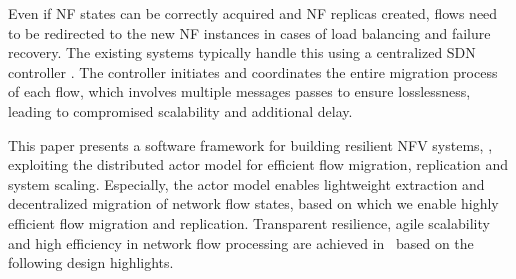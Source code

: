 Even if NF states can be correctly acquired and NF replicas created, flows need to be redirected to the new NF instances in cases of load balancing and failure recovery. The existing systems typically handle this using a centralized SDN controller \cite{gember2015opennf} . The controller initiates and coordinates the entire migration process of each flow, which involves multiple messages passes to ensure losslessness, leading to compromised scalability and additional delay. %



This paper presents a software framework for building resilient NFV systems, \nfactor, exploiting the distributed actor model \cite{actor-wiki, akka, newell2016optimizing} for efficient flow migration, replication and system scaling. %
Especially, the actor model enables %
 lightweight extraction and decentralized migration of network flow states, based on which we enable highly efficient flow migration and replication. 
Transparent resilience, agile scalability and high efficiency in network flow processing are achieved in \nfactor~based on the following design highlights. 

